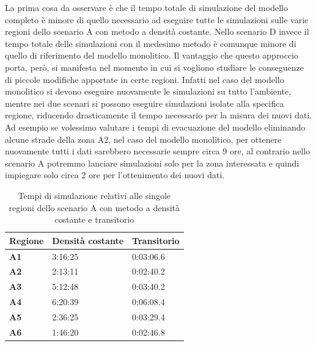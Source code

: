 La prima cosa da osservare è che il tempo totale di simulazione del modello completo è minore di quello necessario ad eseguire tutte le simulazioni sulle varie regioni dello scenario A con metodo a densità costante. Nello scenario D invece il tempo totale delle simulazioni con il medesimo metodo è comunque minore di quello di riferimento del modello monolitico. Il vantaggio che questo approccio porta, però, si manifesta nel momento in cui si vogliono studiare le conseguenze di piccole modifiche apportate in certe regioni. Infatti nel caso del modello monolitico si devono eseguire nuovamente le simulazioni su tutto l'ambiente, mentre nei due scenari si possono eseguire simulazioni isolate alla specifica regione, riducendo drasticamente il tempo necessario per la misura dei nuovi dati. Ad esempio se volessimo valutare i tempi di evacuazione del modello eliminando alcune strade della zona A2, nel caso del modello monolitico, per ottenere nuovamente tutti i dati sarebbero necessarie sempre circa 9 ore, al contrario nello scenario A potremmo lanciare simulazioni solo per la zona interessata e quindi impiegare solo circa 2 ore per l'ottenimento dei nuovi dati.
 
\begin{table}[h]
  \centering
  \resizebox{0.7\textwidth}{!} {
  \begin{tabular}[t]{ |l|l|l| }
	\hline
	\textbf{Regione}	&		\textbf{Densità costante}	&		\textbf{Transitorio}	\\ \hline
	\textbf{A1} 		&		3:16:25					&		0:03:06.6			\\ \hline
	\textbf{A2}			 &		2:13:11 				&		0:02:40.2		\\ \hline
	\textbf{A3}			 &		5:12:48 				&		0:03:40.2		\\ \hline
	\textbf{A4}			 &		6:20:39 				&		0:06:08.4			\\ \hline
	\textbf{A5}			 &		2:36:25 				&		0:03:29.4		\\ \hline
	\textbf{A6}			 &		1:46:20 				&		0:02:46.8		\\ \hline

  \end{tabular}
  
  }
  \caption{Tempi di simulazione relativi alle singole regioni dello scenario A con metodo a densità costante e transitorio}
  \label{tab:tabella-dati-simulazioni-A}
\end{table}


